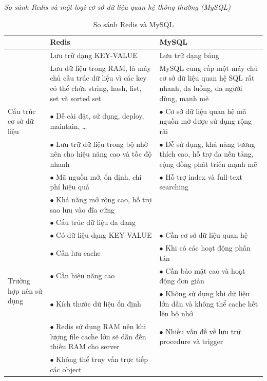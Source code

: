 \textit{So sánh Redis và một loại cơ sở dữ liệu quan hệ thông thường (MySQL)}
\begin{table}[H]
\centering
\begin{tabular}{| m{3cm} | m{6cm} | m{6cm} |}
\hline
& \textbf{Redis} & \textbf{MySQL} \\ 

\hline
\multirow{5}{3cm}{Cấu trúc cơ sở dữ liệu} &
Lưu trữ dạng KEY-VALUE & Lưu trữ dạng bảng \\  
\cline{2-3}
& Lưu dữ liệu trong RAM, là máy chủ cấu trúc dữ
liệu vì các key có thể chứa string, hash, list,
set và sorted set
& MySQL cung cấp một máy chủ cơ sở dữ liệu quan hệ SQL
rất nhanh, đa luồng, đa người dùng, mạnh mẽ \\  

\hline
\multirow{9}{3cm}{Ưu điểm}
& $\bullet$ Dễ cài đặt, sử dụng, deploy, maintain, … & 
$\bullet$ Cơ sở dữ liệu quan hệ mã nguồn mở được sử dụng rộng rãi \\
& $\bullet$ Lưu trữ dữ liệu trong bộ nhớ nên cho hiệu
    năng cao và tốc độ nhanh &
$\bullet$ Dễ sử dụng, khả năng tương thích cao, hỗ trợ đa nền tảng,
cộng đồng phát triển mạnh mẽ \\
& $\bullet$ Mã nguồn mở, ổn định, chi phí hiệu quả &
$\bullet$ Hỗ trợ index và full-text searching \\
& $\bullet$ Khả năng mở rộng cao, hỗ trợ sao lưu vào đĩa cứng & \\
& $\bullet$ Cấu trúc dữ liệu đa dạng & \\
\hline
\multirow{5}{3cm}{Trường hợp nên sử dụng} & 
$\bullet$ Có dữ liệu dạng KEY-VALUE & $\bullet$ Cần cơ sở dữ liệu quan hệ \\
& $\bullet$ Cần lưu cache & $\bullet$ Khi có các hoạt động phân tán \\
& $\bullet$ Cần hiệu năng cao &
$\bullet$ Cần bảo mật cao và hoạt động đơn giản \\
& $\bullet$ Kích thước dữ liệu ổn định &
$\bullet$ Không sử dụng khi dữ liệu lớn dần và 
không thể cache hết lên bộ nhớ \\
\hline
\multirow{3}{3cm}{Nhược điểm} & 
$\bullet$ Redis sử dụng RAM nên khi lượng file cache lớn sẽ
dẫn đến thiếu RAM cho server &
$\bullet$ Nhiều vấn đề về lưu trữ procedure và trigger \\
& $\bullet$ Không thể truy vấn trực tiếp các object & \\
\hline
\end{tabular}
\caption{So sánh Redis và MySQL}
\end{table}

